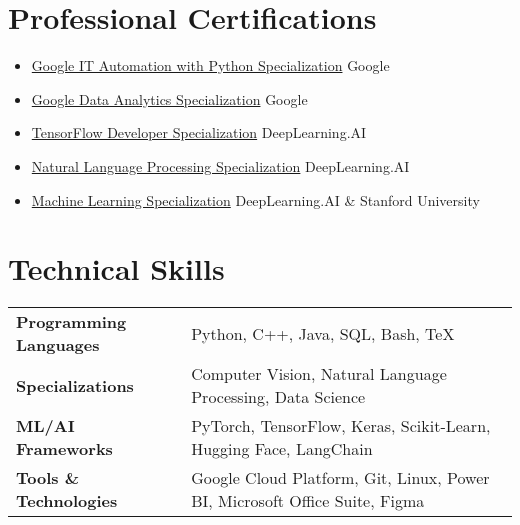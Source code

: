 \documentclass[a4paper,10pt]{article}
\begin{document}
\section{Professional Certifications}
\begin{itemize}[nosep, leftmargin=1em, itemsep=2pt, label=\textbullet]
\item \href{https://www.coursera.org/account/accomplishments/specialization/XWCXBMCME5CP}{Google IT Automation with Python Specialization} \hfill Google
\item \href{https://www.coursera.org/account/accomplishments/specialization/ARJMR4LS8LEX}{Google Data Analytics Specialization} \hfill Google
\item \href{https://www.coursera.org/account/accomplishments/specialization/VBCR7M7P5TKS}{TensorFlow Developer Specialization} \hfill DeepLearning.AI
\item \href{https://www.coursera.org/account/accomplishments/specialization/CGYD8LFTMX5Y}{Natural Language Processing Specialization} \hfill DeepLearning.AI
\item \href{https://www.coursera.org/account/accomplishments/specialization/FQ5Y5AMR732R}{Machine Learning Specialization} \hfill DeepLearning.AI \& Stanford University
\end{itemize}

\section{Technical Skills}
\begin{tabularx}{\linewidth}{@{}l X@{}}
\textbf{Programming Languages} & Python, C++, Java, SQL, Bash, TeX \\
\textbf{Specializations} & Computer Vision, Natural Language Processing, Data Science \\
\textbf{ML/AI Frameworks} & PyTorch, TensorFlow, Keras, Scikit-Learn, Hugging Face, LangChain \\
\textbf{Tools \& Technologies} & Google Cloud Platform, Git, Linux, Power BI, Microsoft Office Suite, Figma \\
\end{tabularx}
\end{document}
